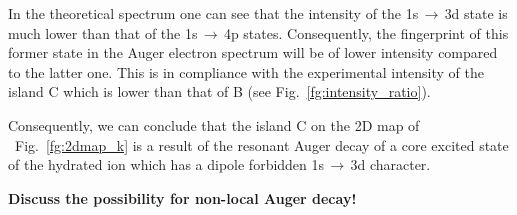 \begin{enumerate}
In the theoretical spectrum one can see that the intensity of the 1s$\,\rightarrow\,$3d state is much lower than that of the 1s$\,\rightarrow\,$4p states. Consequently, the fingerprint of this former state in the Auger electron spectrum will be of lower intensity compared to the latter one. This is in compliance with the experimental intensity of the island C which is lower than that of B (see Fig.\ \ref{fg:intensity_ratio}).

Consequently, we can conclude that the island C on the 2D map of \ki~Fig.\ \ref{fg:2dmap_k} is a result of the resonant Auger decay of a core excited state of the hydrated ion which has a dipole forbidden 1s$\,\rightarrow\,$3d character.


\end{enumerate}


{\color{blue}\bf Discuss the possibility for non-local Auger decay!}